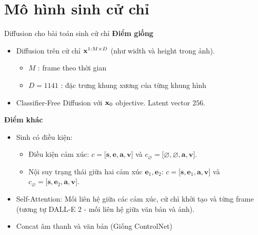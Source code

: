 
\section{Mô hình sinh cử chỉ}

\begin{frame}{Diffusion cho bài toán sinh cử chỉ}
	\textbf{Điểm giống}
	\begin{itemize}
		\item Diffusion \cite{yang2023diffusestylegesture} trên cử chỉ $\mathbf{x}^{1:M \times D}$ (như width và height trong ảnh).
		\begin{itemize}
			\item $M$ : frame theo thời gian
			\item $D=1141$ : đặc trưng khung xương của từng khung hình
		\end{itemize}
		\item Classifier-Free Diffusion với $\mathbf{x}_0$ objective. Latent vector $256$.
		\end{itemize}
		
		\textbf{Điểm khác}
		
		\begin{itemize}
			\item Sinh có điều kiện:
			\begin{itemize}
				\item Điều kiện cảm xúc: $c = \big[ \mathbf{s}, \mathbf{e}, \mathbf{a}, \mathbf{v} \big]$ và $c_{\varnothing} = \big[ \varnothing, \varnothing, \mathbf{a}, \mathbf{v}\big]$.
				\item Nội suy trạng thái giữa hai cảm xúc $\mathbf{e}_1, \mathbf{e}_2$: $c = \big[ \mathbf{s}, \mathbf{e}_1, \mathbf{a}, \mathbf{v} \big]$ và $c_{\varnothing} = \big[ \mathbf{s}, \mathbf{e}_2, \mathbf{a}, \mathbf{v} \big]$.
			\end{itemize}
			\item Self-Attention: Mối liên hệ giữa các cảm xúc, cử chỉ khởi tạo và từng frame (tương tự DALL-E 2 - mối liên hệ giữa văn bản và ảnh).
			\item Concat âm thanh và văn bản (Giống ControlNet)
		\end{itemize}
\end{frame}



